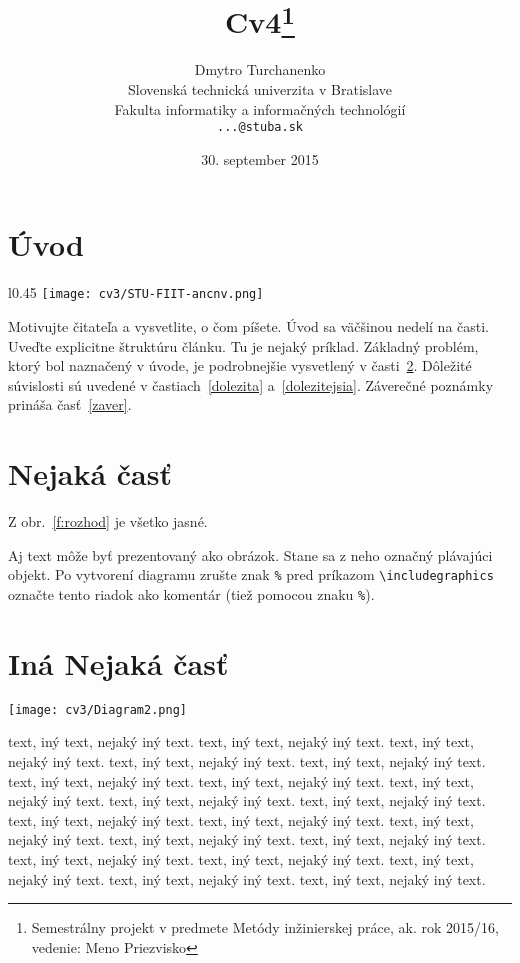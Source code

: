 \documentclass[10pt,twoside,twocolumn,slovak,a4paper,twocoloum]{article}
\title{Cv4\thanks{Semestrálny projekt v predmete Metódy inžinierskej práce, ak. rok 2015/16, vedenie: Meno Priezvisko}} %
\author{Dmytro Turchanenko\\[2pt]
	{\small Slovenská technická univerzita v Bratislave}\\
	{\small Fakulta informatiky a informačných technológií}\\
	{\small \texttt{...@stuba.sk}}
	}
\date{\small 30. september 2015} %
\begin{document}
    

\maketitle

\begin{abstract}
\end{abstract}



\section{Úvod}
\begin{wrapfigure}{l}{0.45\linewidth}
  \texttt{[image: cv3/STU-FIIT-ancnv.png]}
  \caption{Logo STU FIIT}
  \label{obr:logo}
\end{wrapfigure}
Motivujte čitateľa a vysvetlite, o čom píšete. Úvod sa väčšinou nedelí na časti.
Uveďte explicitne štruktúru článku. Tu je nejaký príklad.
Základný problém, ktorý bol naznačený v úvode, je podrobnejšie vysvetlený v časti~\ref{nejaka}.
Dôležité súvislosti sú uvedené v častiach~\ref{dolezita} a~\ref{dolezitejsia}.
Záverečné poznámky prináša časť~\ref{zaver}.



\section{Nejaká časť} \label{nejaka}

Z obr.~\ref{f:rozhod} je všetko jasné. 

\begin{figure*}[tbh]
\centering
Aj text môže byť prezentovaný ako obrázok. Stane sa z neho označný plávajúci objekt. Po vytvorení diagramu zrušte znak \texttt{\%} pred príkazom \verb|\includegraphics| označte tento riadok ako komentár (tiež pomocou znaku \texttt{\%}).
\caption{Rozhodujúci argument.}
\label{f:rozhod}
\end{figure*}

\section{Iná Nejaká časť} \label{ina}
\texttt{[image: cv3/Diagram2.png]}

text, iný text, nejaký iný text.
text, iný text, nejaký iný text.
text, iný text, nejaký iný text.
text, iný text, nejaký iný text.
text, iný text, nejaký iný text.
text, iný text, nejaký iný text.
text, iný text, nejaký iný text.
text, iný text, nejaký iný text.
text, iný text, nejaký iný text.
text, iný text, nejaký iný text.
text, iný text, nejaký iný text.
text, iný text, nejaký iný text.
text, iný text, nejaký iný text.
text, iný text, nejaký iný text.
text, iný text, nejaký iný text.
text, iný text, nejaký iný text.
text, iný text, nejaký iný text.
text, iný text, nejaký iný text.
text, iný text, nejaký iný text.
text, iný text, nejaký iný text.
\end{document}
